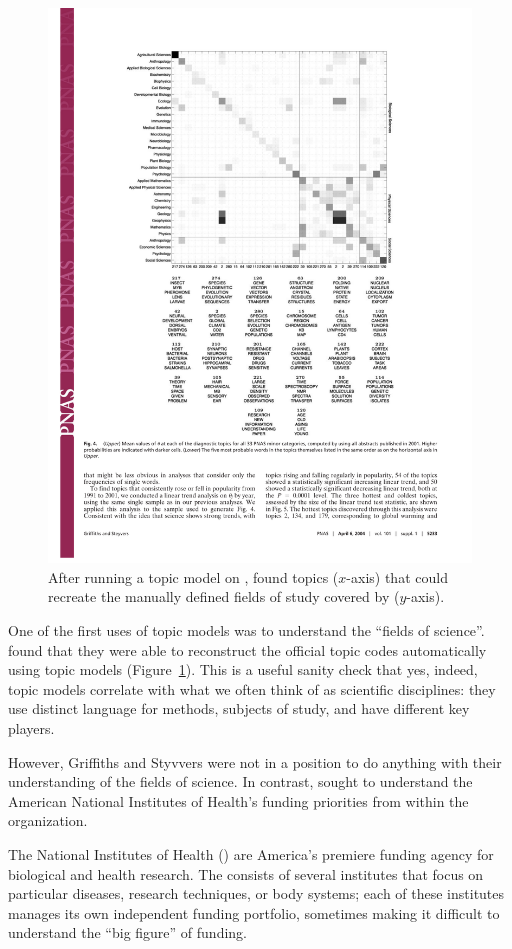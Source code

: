 \begin{figure}
  \includegraphics[width=.8\linewidth]{figures/sci_gs}
  \caption{After running a topic model on ,
    \citet{griffiths-04} found topics ($x$-axis) that could recreate
    the manually defined fields of study covered by 
    ($y$-axis).}
\label{fig:pnas}
\end{figure}

One of the first uses of topic models was to understand the ``fields
of science''.  \citet{griffiths-04} found that they were able to
reconstruct the official  topic codes automatically using
topic models (Figure~\ref{fig:pnas}).  This is a useful sanity check
that yes, indeed, topic models correlate with what we often think of
as scientific disciplines: they use distinct language for methods,
subjects of study, and have different key players.

However, Griffiths and Styvvers were not in a position to do anything
with their understanding of the fields of science.  In contrast,
\citet{talley-11} sought to understand the American National Institutes
of Health's funding priorities from within the organization.

The National Institutes of Health () are America's premiere funding
agency for biological and health research.  The  consists of
several institutes that focus on particular diseases, research techniques, or body
systems; each of these institutes manages its own independent funding portfolio,
sometimes making it difficult to understand the ``big figure'' of funding.

